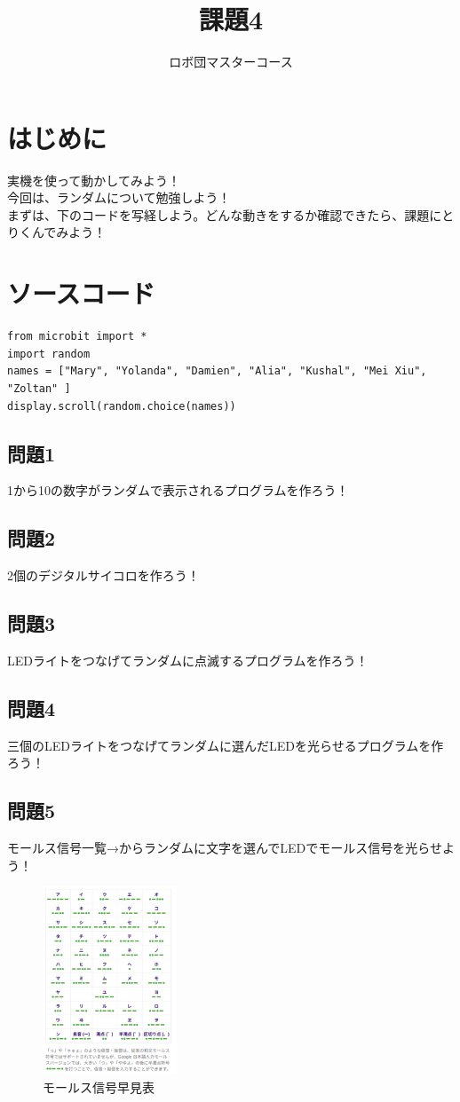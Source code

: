 \documentclass[dvipdfmx]{jsarticle}
\begin{document}
\title{課題4}
\author{ロボ団マスターコース}
\maketitle

\section{はじめに}
実機を使って動かしてみよう！\\
今回は、ランダムについて勉強しよう！\\
まずは、下のコードを写経しよう。どんな動きをするか確認できたら、課題にとりくんでみよう！\\
\section{ソースコード}
\begin{lstlisting} 
from microbit import *
import random
names = ["Mary", "Yolanda", "Damien", "Alia", "Kushal", "Mei Xiu", "Zoltan" ]
display.scroll(random.choice(names))
\end{lstlisting}

\subsection{問題1}
1から10の数字がランダムで表示されるプログラムを作ろう！
\subsection{問題2}
2個のデジタルサイコロを作ろう！
\subsection{問題3}
LEDライトをつなげてランダムに点滅するプログラムを作ろう！
\subsection{問題4}
三個のLEDライトをつなげてランダムに選んだLEDを光らせるプログラムを作ろう！
\subsection{問題5}
モールス信号一覧→からランダムに文字を選んでLEDでモールス信号を光らせよう！
\begin{figure}[H]
  \centering
  \includegraphics[width=4cm]{1.png}
  \caption{モールス信号早見表}
\end{figure}
\end{document}
